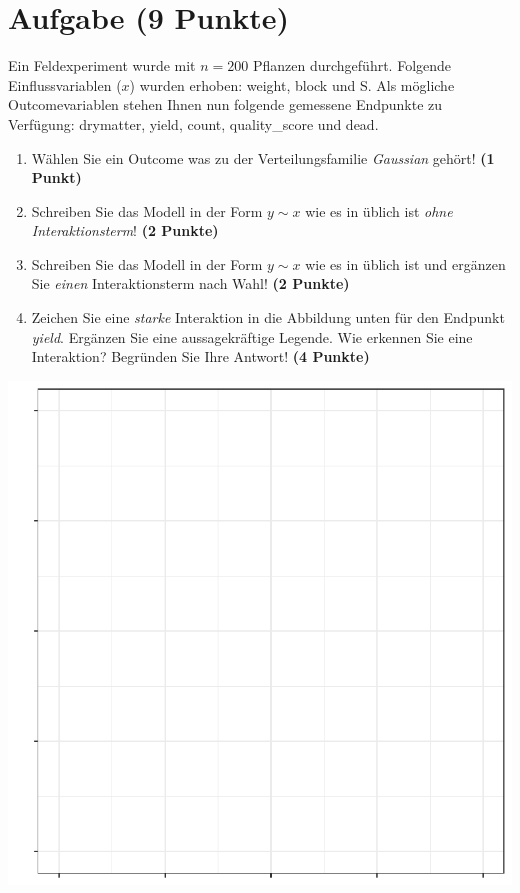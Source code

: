 \documentclass[a4paper, 10pt]{scrartcl}\usepackage[]{graphicx}\usepackage[]{xcolor}
\makeatletter
\def\maxwidth{ %
  \ifdim\Gin@nat@width>\linewidth
    \linewidth
  \else
    \Gin@nat@width
  \fi
}
\makeatother
\begin{document}
 
\clearpage

\section{Aufgabe \hfill (9 Punkte)}



Ein Feldexperiment wurde mit $n = 200$ Pflanzen durchgef{\"u}hrt. Folgende
Einflussvariablen ($x$) wurden erhoben: weight, block und S. Als m{\"o}gliche Outcomevariablen stehen Ihnen nun
folgende gemessene Endpunkte zu Verf{\"u}gung: drymatter, yield, count, quality\_score und dead.

\begin{enumerate}
\item W{\"a}hlen Sie ein Outcome was zu der Verteilungsfamilie
  \textit{Gaussian} geh{\"o}rt! \textbf{(1 Punkt)}
\item Schreiben Sie das Modell in der Form $y \sim x$ wie es in \Rlogo
  {\"u}blich ist \textit{ohne Interaktionsterm}! \textbf{(2 Punkte)}
\item Schreiben Sie das Modell in der Form $y \sim x$ wie es in \Rlogo
  {\"u}blich ist und erg{\"a}nzen Sie \textit{einen} Interaktionsterm nach Wahl! \textbf{(2 Punkte)} 
\item Zeichen Sie eine \textit{starke}
  Interaktion in die Abbildung unten f{\"u}r den Endpunkt
  \textit{yield}. Erg{\"a}nzen Sie eine aussagekr{\"a}ftige Legende. Wie erkennen
  Sie eine Interaktion? Begr{\"u}nden Sie Ihre Antwort! \textbf{(4 Punkte)}
\end{enumerate}



{\centering \includegraphics[width=\maxwidth]{img/modeling-R-01-1} 

}
\end{document}
